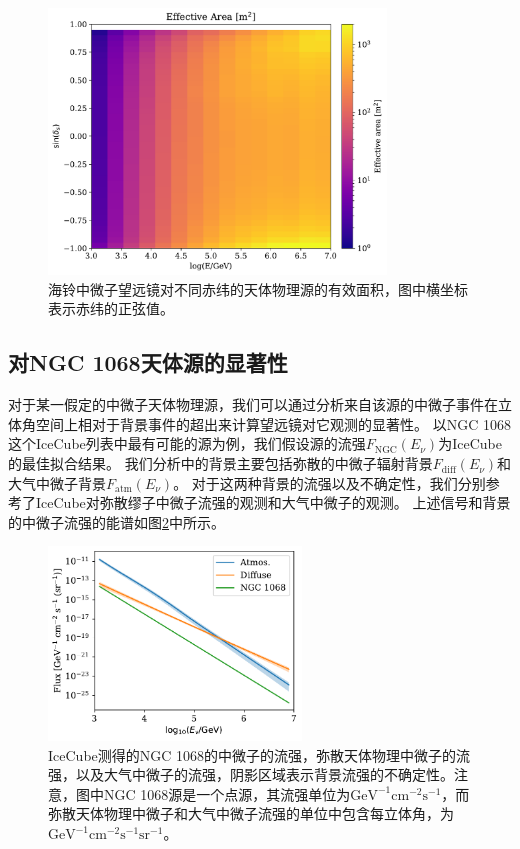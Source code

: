 \begin{figure}[!htb]%
    \centering
    \includegraphics[width=0.80\textwidth]{img/eff_area_with_lat.pdf}
    \caption{海铃中微子望远镜对不同赤纬的天体物理源的有效面积，图中横坐标表示赤纬的正弦值。}
    \label{fig:eff_area_with_lat}
\end{figure}



\subsection{对NGC 1068天体源的显著性}

对于某一假定的中微子天体物理源，我们可以通过分析来自该源的中微子事件在立体角空间上相对于背景事件的超出来计算望远镜对它观测的显著性。
以NGC 1068这个IceCube列表中最有可能的源为例，我们假设源的流强$F_\mathrm{NGC}(E_\nu)$为IceCube的最佳拟合结果\cite{IceCube_NGC1068:2022}。
我们分析中的背景主要包括弥散的中微子辐射背景$F_\mathrm{diff}(E_\nu)$和大气中微子背景$F_\mathrm{atm}(E_\nu)$。
对于这两种背景的流强以及不确定性，我们分别参考了IceCube对弥散缪子中微子流强的观测\cite{IceCube_diffse_muon:2021}和大气中微子的观测\cite{IceCube_atmos_nu:2014}。
上述信号和背景的中微子流强的能谱如图\ref{fig:source_background_flux}中所示。

\begin{figure}[!htb]%
    \centering
    \includegraphics[width=0.60\textwidth]{img/source_background_flux.pdf}
    \caption{IceCube测得的NGC 1068的中微子的流强，弥散天体物理中微子的流强，以及大气中微子的流强，阴影区域表示背景流强的不确定性。注意，图中NGC 1068源是一个点源，其流强单位为$\mathrm{GeV^{-1} cm^{-2} s^{-1}}$，而弥散天体物理中微子和大气中微子流强的单位中包含每立体角，为$\mathrm{GeV^{-1} cm^{-2} s^{-1} sr^{-1}}$。}
    \label{fig:source_background_flux}
\end{figure}

